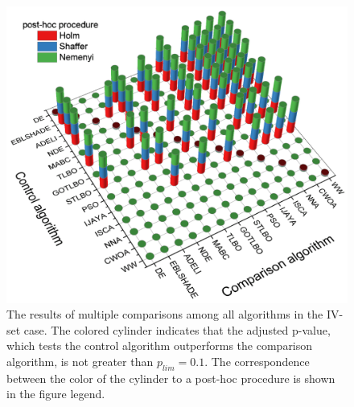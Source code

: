 \documentclass[a4paper,fleqn]{cas-dc}
\begin{document}
\begin{figure}[]
	\centering
		\includegraphics[width=1.0\columnwidth]{NNresult}
	  \caption{The results of multiple comparisons among all algorithms in the IV-set case.
               The colored cylinder indicates that the adjusted p-value,
               which tests the control algorithm outperforms the comparison algorithm,
               is not greater than $p_{lim}=0.1$.
               The correspondence between the color of the cylinder to a post-hoc procedure is shown in the figure legend.
               }\label{figNNRezIVset}
\end{figure}



\end{document}
